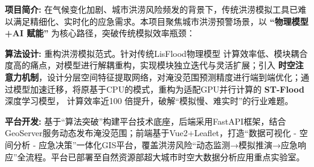 \documentclass{resume}
\begin{document}
\begin{itemize}
  {\small

\vspace{0.1cm}
\item \textbf{项目简介:} 
在气候变化加剧、城市洪涝风险频发的背景下，传统洪涝模拟工具已难以满足精细化、实时化的应急需求。本项目聚焦城市洪涝预警场景，以 \textbf{“物理模型+AI 赋能”} 为核心路径，突破传统模拟效率瓶颈：   
\vspace{0.2cm}
\item \textbf{算法设计:} 重构洪涝模拟范式。针对传统LisFlood物理模型 计算效率低、模块耦合度高的痛点，对模型进行解耦重构，实现模块独立迭代与灵活扩展；引入 \textbf{时空注意力机制}，设计分层空间特征提取网络，对淹没范围预测精度进行端到端优化；通过模型加速迁移，将原基于CPU的模式，重构为适配GPU并行计算的 \textbf{ST-Flood}深度学习模型， 计算效率近100 倍提升，破解“模拟慢、难实时”的行业难题。  

\vspace{0.2cm}

\item \textbf{平台开发:} 基于“算法突破”构建平台技术底座，后端采用FastAPI框架，结合GeoServer服务动态发布淹没范围；前端基于Vue2+Leaflet，打造“数据可视化 - 空间分析 - 应急决策”一体化GIS平台，覆盖洪涝风险“动态监测→模拟推演→应急响应”全流程。平台已部署至自然资源部超大城市时空大数据分析应用重点实验室。
  }

\end{itemize}




\vspace{0.2cm}
\end{document}
